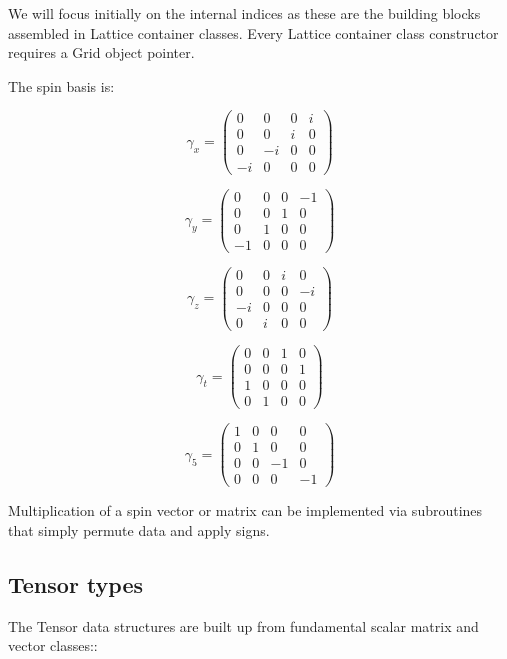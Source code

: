 \documentclass[letter,10pt]{report}
\begin{document}
We will focus initially on the internal indices as these are the building blocks assembled
in Lattice container classes. Every Lattice container class constructor requires a Grid object 
pointer. 

The spin basis is:

$$ \gamma_x= \left(\begin{array}{cccc}    0& 0& 0& i\\  0& 0& i& 0\\  0&-i& 0& 0\\ -i& 0& 0& 0 \end{array}\right)$$

$$ \gamma_y= \left(\begin{array}{cccc}    0& 0& 0&-1\\  0& 0& 1& 0\\  0& 1& 0& 0\\ -1& 0& 0& 0 \end{array}\right)$$

$$ \gamma_z= \left(\begin{array}{cccc}    0& 0& i& 0\\  0& 0& 0&-i\\ -i& 0& 0& 0\\  0& i& 0& 0 \end{array}\right)$$

$$ \gamma_t= \left(\begin{array}{cccc}    0& 0& 1& 0\\  0& 0& 0& 1\\  1& 0& 0& 0\\  0& 1& 0& 0 \end{array}\right)$$

$$ \gamma_5= \left(\begin{array}{cccc}    1& 0& 0& 0\\  0& 1& 0& 0\\  0& 0&-1 &0\\  0& 0& 0&-1 \end{array}\right)$$

Multiplication of a spin vector or matrix can be implemented via subroutines that simply permute data and apply signs.

\subsection{Tensor types}

The Tensor data structures are built up from fundamental 
scalar matrix and vector classes::
\end{document}
